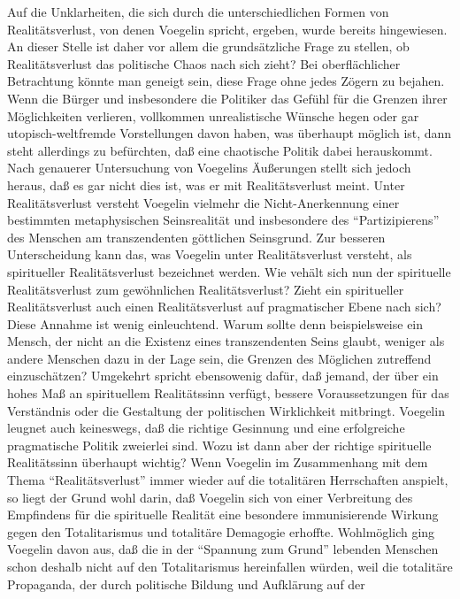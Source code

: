 Auf die Unklarheiten, die sich durch die unterschiedlichen Formen von
Realitätsverlust, von denen Voegelin spricht, ergeben, wurde bereits
hingewiesen. An dieser Stelle ist daher vor allem die grundsätzliche
Frage zu stellen, ob Realitätsverlust das politische Chaos nach sich
zieht?  Bei oberflächlicher Betrachtung könnte man geneigt sein, diese
Frage ohne jedes Zögern zu bejahen. Wenn die Bürger und insbesondere die
Politiker das Gefühl für die Grenzen ihrer Möglichkeiten verlieren,
vollkommen unrealistische Wünsche hegen oder gar utopisch-weltfremde
Vorstellungen davon haben, was überhaupt möglich ist, dann steht
allerdings zu befürchten, daß eine chaotische Politik dabei herauskommt.
Nach genauerer Untersuchung von Voegelins Äußerungen stellt sich jedoch
heraus, daß es gar nicht dies ist, was er mit Realitätsverlust meint.
Unter Realitätsverlust versteht Voegelin vielmehr die Nicht-Anerkennung
einer bestimmten metaphysischen Seinsrealität und insbesondere des
"`Partizipierens"' des Menschen am transzendenten göttlichen Seinsgrund.
Zur besseren Unterscheidung kann das, was Voegelin unter
Realitätsverlust versteht, als spiritueller Realitätsverlust bezeichnet
werden. Wie vehält sich nun der spirituelle Realitätsverlust zum
gewöhnlichen Realitätsverlust? Zieht ein spiritueller Realitätsverlust
auch einen Realitätsverlust auf pragmatischer Ebene nach sich? Diese
Annahme ist wenig einleuchtend. Warum sollte denn beispielsweise ein
Mensch, der nicht an die Existenz eines transzendenten Seins glaubt,
weniger als andere Menschen dazu in der Lage sein, die Grenzen des
Möglichen zutreffend einzuschätzen?  Umgekehrt spricht ebensowenig
dafür, daß jemand, der über ein hohes Maß an spirituellem Realitätssinn
verfügt, bessere Voraussetzungen für das Verständnis oder die Gestaltung
der politischen Wirklichkeit mitbringt.  Voegelin leugnet auch
keineswegs, daß die richtige Gesinnung und eine erfolgreiche
pragmatische Politik zweierlei sind. Wozu ist dann aber der richtige
spirituelle Realitätssinn überhaupt wichtig? Wenn Voegelin im
Zusammenhang mit dem Thema "`Realitätsverlust"' immer wieder auf die
totalitären Herrschaften anspielt, so liegt der Grund wohl darin, daß
Voegelin sich von einer Verbreitung des Empfindens für die spirituelle
Realität eine besondere immunisierende Wirkung gegen den Totalitarismus
und totalitäre Demagogie erhoffte. Wohlmöglich ging Voegelin davon aus,
daß die in der "`Spannung zum Grund"' lebenden Menschen schon deshalb
nicht auf den Totalitarismus hereinfallen würden, weil die totalitäre
Propaganda, der durch politische Bildung und Aufklärung auf der
